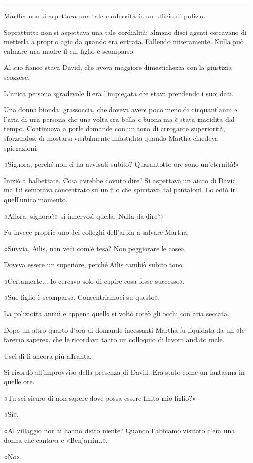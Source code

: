 \plainbreak{1}

Martha non si aspettava una tale modernità in un ufficio di polizia.

Soprattutto non si aspettava una tale cordialità: almeno dieci agenti cercavano di metterla a
proprio agio da quando era entrata. Fallendo miseramente. Nulla può calmare una madre il cui figlio
è scomparso.

Al suo fianco stava David, che aveva maggiore dimestichezza con la giustizia scozzese.

L'unica persona sgradevole lì era l'impiegata che stava prendendo i suoi dati.

Una donna bionda, grassoccia, che doveva avere poco meno di cinquant'anni e l'aria di una persona
che una volta era bella e buona ma è stata inacidita dal tempo. Continuava a porle domande con un
tono di arrogante superiorità, sforzandosi di mostarsi visibilmente infastidita quando Martha
chiedeva spiegazioni.

«Signora, perché non ci ha avvisati subito? Quarantotto ore sono un'eternità!»

Iniziò a balbettare. Cosa avrebbe dovuto dire? Si aspettava un aiuto di David, ma lui sembrava
concentrato su un filo che spuntava dai pantaloni. Lo odiò in quell'unico momento.

«Allora, signora?» si innervosì quella. Nulla da dire?»

Fu invece proprio uno dei colleghi dell'arpia a salvare Martha.

«Suvvia, Ailis, non vedi com'è tesa? Non peggiorare le cose».

Doveva essere un superiore, perché Ailis cambiò subito tono.

«Certamente... Io cercavo solo di capire cosa fosse successo».

«Suo figlio è scomparso. Concentriamoci su questo».

La poliziotta annuì e appena quello si voltò roteò gli occhi con aria seccata.

Dopo un altro quarto d'ora di domande incessanti Martha fu liquidata da un «le faremo sapere», che
le ricordava tanto un colloquio di lavoro andato male.

Uscì di lì ancora più affranta.

Si ricordò all'improvviso della presenza di David. Era stato come un fantasma in quelle ore.

«Tu sei sicuro di non sapere dove possa essere finito mio figlio?»

«Sì».

«Al villaggio non ti hanno detto niente? Quando l'abbiamo visitato c'era una donna che cantava e
«Benjamin..».

«No».
